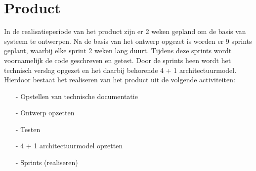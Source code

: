 \section{Product}
In de realisatieperiode van het product zijn er 2 weken gepland om de basis van systeem te ontwerpen.
Na de basis van het ontwerp opgezet is worden er 9 sprints geplant, waarbij elke sprint 2 weken lang duurt.
Tijdens deze sprints wordt voornamelijk de code geschreven en getest.
Door de sprints heen wordt het technisch verslag opgezet en het daarbij behorende 4 + 1 architectuurmodel.
Hierdoor bestaat het realiseren van het product uit de volgende activiteiten: \\

\whitespace
\begin{itemize}
    \item[-] Opstellen van technische documentatie
    \item[-] Ontwerp opzetten
    \item[-] Testen
    \item[-] 4 + 1 architectuurmodel opzetten
    \item[-] Sprints (realiseren)
\end{itemize}
